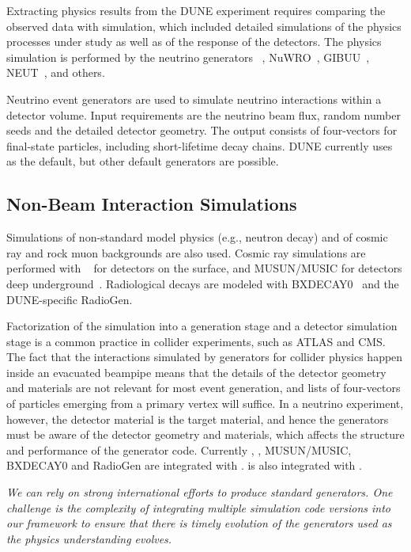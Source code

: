 \documentclass[../main-v1.tex]{subfiles}
\begin{document}
Extracting physics results from the DUNE experiment requires comparing the observed data with simulation, 
which included detailed simulations 
of the physics processes under study as well as of the response of the detectors.  The physics simulation is performed by the neutrino generators ~\cite{Andreopoulos:2009rq}, NuWRO~\cite{NuWro2012}, GIBUU~\cite{Gallmeister:2016dnq}, NEUT~\cite{Hayato:2009zz}, and others. 

Neutrino event generators are used to simulate neutrino interactions within a detector volume.  Input requirements are the neutrino beam flux, random number seeds and the detailed detector geometry. The output consists of four-vectors for final-state particles, including short-lifetime decay chains.  DUNE currently uses ~\cite{GENIE} as the default, but other default generators are possible. 

\subsection{Non-Beam Interaction Simulations}
Simulations of non-standard model physics (e.g., neutron decay) and of cosmic ray and rock muon backgrounds are also used.  Cosmic ray simulations are performed with ~\cite{Wentz:2003bp,Dembinski:2020wrp} for detectors on the surface, and MUSUN/MUSIC for detectors deep underground~\cite{Kudryavtsev:2008qh,LBNEDOCDB9673}.  Radiological decays are modeled with BXDECAY0~\cite{Ponkratenko:2000um} and the DUNE-specific RadioGen.

Factorization of the simulation into a generation stage and a detector simulation stage is a common practice %
in collider experiments, such as ATLAS and CMS.  The fact that the interactions simulated by generators for collider physics happen inside an evacuated beampipe means that the details of the detector geometry and materials are not relevant for most event generation, and lists of four-vectors of particles emerging from a primary vertex will suffice.  In a neutrino experiment, however, the detector material is the target material, and hence the generators must be aware of the detector geometry and materials, which affects the structure and performance of the generator code.  Currently , , MUSUN/MUSIC, BXDECAY0 and RadioGen are integrated with .   is also integrated with .

{\it We can rely on strong international efforts to produce standard generators. One challenge is the complexity of integrating multiple simulation code versions into our framework to ensure that there is timely evolution of the generators used as the physics understanding evolves.}
\end{document}

